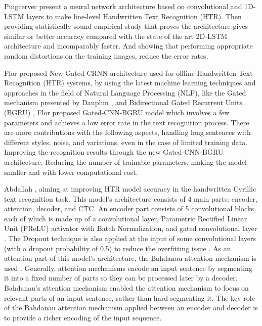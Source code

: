 \documentclass[preprint,12pt]{elsarticle}
\begin{document}
Puigcerver \cite{puigcerver2017multidimensional} present a neural network architecture based on convolutional and 1D-LSTM layers to make line-level Handwritten Text Recognition (HTR). Then providing statistically sound empirical study that proves the architecture gives similar or better accuracy compared with the state of the art 2D-LSTM architecture and incomparably faster. And showing that performing appropriate random distortions on the training images, reduce the error rates. 

Flor\cite{de2020htr} proposed New Gated CRNN architecture used for offline Handwritten Text Recognition (HTR) systems, by using the latest machine learning techniques and approaches in the field of Natural Language Processing (NLP), like the Gated mechanism presented by Dauphin \cite{dauphin2017language}, and Bidirectional Gated Recurrent Units (BGRU) \cite{cho2014learning}, Flor proposed Gated-CNN-BGRU model which involves a few parameters and achieves a low error rate in the text recognition process. There are more contributions with the following aspects, handling long sentences with different styles, noise, and variations, even in the case of limited training data. Improving the recognition results through the new Gated-CNN-BGRU architecture. Reducing the number of trainable parameters, making the model smaller and with lower computational cost.

Abdallah \cite{Abdallah_2020}, aiming at improving HTR model accuracy in the handwritten Cyrillic text recognition task. This model's architecture consists of 4 main parts: encoder, attention, decoder, and CTC.
An encoder part consists of 5 convolutional blocks, each of which is made up of a convolutional layer, Parametric Rectified Linear Unit (PReLU) activator \cite{he2015delving} with Batch Normalization, and gated convolutional layer \cite{bluche2017gated}. The Dropout technique is also applied at the input of some convolutional layers (with a dropout probability of 0.5) to reduce the overfitting issue \cite{srivastava2014dropout}.
As an attention part of this model's architecture, the Bahdanau attention mechanism is used \cite{bahdanau2015neural}. Generally, attention mechanisms encode an input sentence by segmenting it into a fixed number of parts so they can be processed later by a decoder. Bahdanau's attention mechanism enabled the attention mechanism to focus on relevant parts of an input sentence, rather than hard segmenting it. The key role of the Bahdanau attention mechanism applied between an encoder and decoder is to provide a richer encoding of the input sequence.
\end{document}
